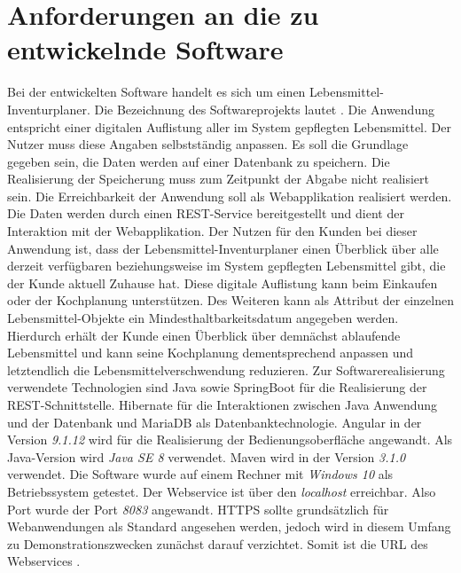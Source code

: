 \section{Anforderungen an die zu entwickelnde Software}
Bei der entwickelten Software handelt es sich um einen Lebensmittel-Inventurplaner.
Die Bezeichnung des Softwareprojekts lautet .
Die Anwendung entspricht einer digitalen Auflistung aller im System gepflegten Lebensmittel. 
Der Nutzer muss diese Angaben selbstständig anpassen. 
Es soll die Grundlage gegeben sein, die Daten werden auf einer Datenbank zu speichern.
Die Realisierung der Speicherung muss zum Zeitpunkt der Abgabe nicht realisiert sein. 
Die Erreichbarkeit der Anwendung soll als Webapplikation realisiert werden.
Die Daten werden durch einen \ac{REST}-Service bereitgestellt und dient der Interaktion mit der Webapplikation.
Der Nutzen für den Kunden bei dieser Anwendung ist, dass der Lebensmittel-Inventurplaner einen Überblick über alle derzeit verfügbaren beziehungsweise im System gepflegten Lebensmittel gibt, die der Kunde aktuell Zuhause hat. 
Diese digitale Auflistung kann beim Einkaufen oder der Kochplanung unterstützen. 
Des Weiteren kann als Attribut der einzelnen Lebensmittel-Objekte ein Mindesthaltbarkeitsdatum angegeben werden. 
Hierdurch erhält der Kunde einen Überblick über demnächst ablaufende Lebensmittel und kann seine Kochplanung dementsprechend anpassen und letztendlich die Lebensmittelverschwendung reduzieren.
Zur Softwarerealisierung verwendete Technologien sind Java sowie SpringBoot für die Realisierung der \ac{REST}-Schnittstelle. Hibernate für die Interaktionen zwischen Java Anwendung und der Datenbank und MariaDB als Datenbanktechnologie. 
Angular in der Version \textit{9.1.12} wird für die Realisierung der Bedienungsoberfläche angewandt.
Als Java-Version wird \textit{Java SE 8} verwendet.
Maven wird in der Version \textit{3.1.0} verwendet.
Die Software wurde auf einem Rechner mit \textit{Windows 10} als Betriebssystem getestet.
Der Webservice ist über den \textit{localhost} erreichbar.
Also Port wurde der Port \textit{8083} angewandt.
\ac{HTTPS} sollte grundsätzlich für Webanwendungen als Standard angesehen werden, jedoch wird in diesem Umfang zu Demonstrationszwecken zunächst darauf verzichtet.
Somit ist die \ac{URL} des Webservices .

